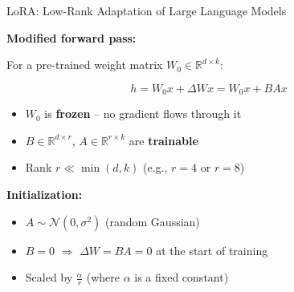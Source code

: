 \documentclass[11pt,compress,t,notes=noshow, xcolor=table]{beamer}
\begin{document}

\begin{frame}{LoRA: Low-Rank Adaptation of Large Language Models}

\vfill

\textbf{Modified forward pass:}

For a pre-trained weight matrix $W_0 \in \mathbb{R}^{d \times k}$:

$$h = W_0 x + \Delta W x = W_0 x + B A x$$

\begin{itemize}
  \item $W_0$ is \textbf{frozen} -- no gradient flows through it
  \item $B \in \mathbb{R}^{d \times r}$, $A \in \mathbb{R}^{r \times k}$ are \textbf{trainable}
  \item Rank $r \ll \min(d, k)$ (e.g., $r = 4$ or $r = 8$)
\end{itemize}

\vfill

\textbf{Initialization:}
\begin{itemize}
  \item $A \sim \mathcal{N}(0, \sigma^2)$ (random Gaussian)
  \item $B = 0$ $\Rightarrow$ $\Delta W = BA = 0$ at the start of training
  \item Scaled by $\frac{\alpha}{r}$ (where $\alpha$ is a fixed constant)
\end{itemize}

\vfill

\end{frame}

\end{document}
